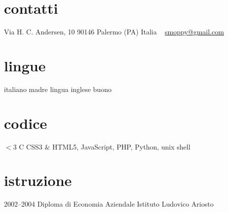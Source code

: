 \documentclass[]{friggeri-cv} %
\begin{document}


\begin{aside} %
\section{contatti}
Via H. C. Andersen, 10
90146 Palermo (PA)
Italia
~
\href{mailto:smoppy@gmail.com}{smoppy@gmail.com}
\section{lingue}
italiano madre lingua
inglese buono
\section{codice}
{\color{red} $<3$} C
CSS3 \& HTML5,
JavaScript, PHP, Python, unix shell
\end{aside}

\section{istruzione}
\begin{entrylist}
\entry
{2002--2004}
{Diploma {\normalfont di Economia Aziendale}}
{Istituto Ludovico Ariosto}
{}
\end{entrylist}

\end{document}
